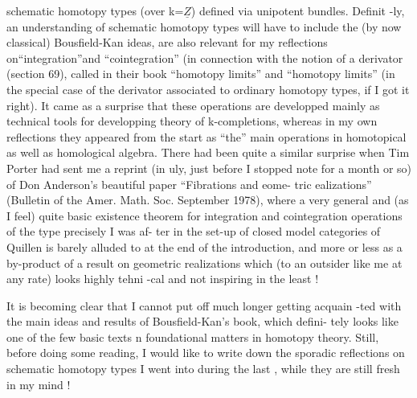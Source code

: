 
schematic homotopy types (over k=$\underline{Z}$) defined via unipotent bundles. Definit
-ly, an understanding of schematic homotopy types will have to include the
(by now classical) Bousfield-Kan ideas,   are also relevant for my
reflections on\allowbreak{}``integration''\allowbreak{}and ``cointegration'' (in connection with the
notion of a derivator (section 69)\hand{)}, called in their book ``homotopy  
limits'' and ``homotopy   limits'' (in the special case of the derivator
associated to ordinary homotopy types, if I got it right). It came as a
surprise that  these operations are developped  mainly as technical tools
for developping   theory of k-completions, whereas in my own reflections
they appeared from the start as ``the'' main operations in homotopical as
well as homological algebra. There had been quite a similar surprise when
Tim Porter had sent me a reprint (in uly, just before I stopped   note
for a month or so) of Don Anderson's beautiful paper ``Fibrations and eome-
tric ealizations'' (Bulletin of the Amer. Math. Soc. September 1978),
where a very general and (as I feel) quite basic existence theorem for
integration and cointegration operations\hand{,} of the type precisely I was af-
ter\hand{,} in the  set-up of closed model categories of Quillen\hand{,} is barely
alluded to at the end of the introduction, and  
more or less as  a by-product of   a result on geometric
realizations which (to an outsider like me at any rate) looks highly tehni
-cal and not inspiring in the least !

It is becoming clear that I cannot put off much longer getting acquain
-ted with the main ideas and results of Bousfield-Kan's book, which defini-
tely looks like one of the few basic texts n  foundational
matters in homotopy theory. Still, before doing some   reading, I
would like to write down the sporadic reflections on schematic homotopy
types I went into during the last  , while they are still fresh in my
mind !


